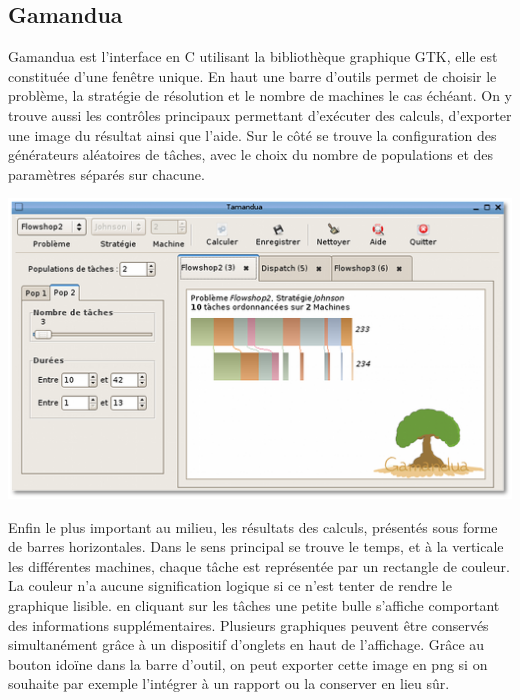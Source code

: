 \subsection{Gamandua}
Gamandua est l'interface en C utilisant la bibliothèque graphique GTK, elle est
constituée d'une fenêtre unique. En haut une barre d'outils permet de choisir 
le problème, la stratégie de résolution et le nombre de machines le cas échéant.
On y trouve aussi les contrôles principaux permettant d'exécuter des calculs,
d'exporter une image du résultat ainsi que l'aide. Sur le côté se trouve la
configuration des générateurs aléatoires de tâches, avec le choix du nombre
de populations et des paramètres séparés sur chacune.
\begin{center}
\includegraphics{gamandua.png}
\end{center}
Enfin le plus important au
milieu, les résultats des calculs, présentés sous forme de barres horizontales.
Dans le sens principal se trouve le temps, et à la verticale les différentes
machines, chaque tâche est représentée par un rectangle de couleur. La couleur
n'a aucune signification logique si ce n'est tenter de rendre le graphique
lisible. en cliquant sur les tâches une petite bulle s'affiche comportant des
informations supplémentaires. Plusieurs graphiques peuvent être conservés
simultanément grâce à un dispositif d'onglets en haut de l'affichage. Grâce au
bouton idoïne dans la barre d'outil, on peut exporter cette image en png si
on souhaite par exemple l'intégrer à un rapport ou la conserver en lieu sûr.
